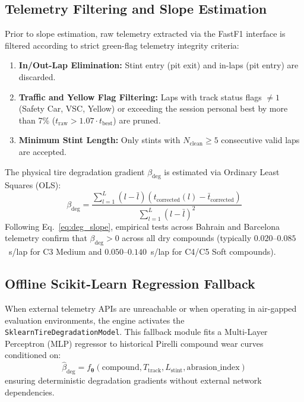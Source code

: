\subsection{Telemetry Filtering and Slope Estimation}
Prior to slope estimation, raw telemetry extracted via the FastF1 interface \cite{roembke2021fastf1} is filtered according to strict green-flag telemetry integrity criteria:
\begin{enumerate}
    \item \textbf{In/Out-Lap Elimination:} Stint entry (pit exit) and in-laps (pit entry) are discarded.
    \item \textbf{Traffic and Yellow Flag Filtering:} Laps with track status flags $\ne 1$ (Safety Car, VSC, Yellow) or exceeding the session personal best by more than 7\% ($t_{\text{raw}} > 1.07 \cdot t_{\text{best}}$) are pruned.
    \item \textbf{Minimum Stint Length:} Only stints with $N_{\text{clean}} \ge 5$ consecutive valid laps are accepted.
\end{enumerate}

The physical tire degradation gradient $\beta_{\text{deg}}$ is estimated via Ordinary Least Squares (OLS):
\begin{equation}
\beta_{\text{deg}} = \frac{\sum_{l=1}^{L} (l - \bar{l})(t_{\text{corrected}}(l) - \bar{t}_{\text{corrected}})}{\sum_{l=1}^{L} (l - \bar{l})^2}
\label{eq:deg_slope}
\end{equation}
Following Eq.~\eqref{eq:deg_slope}, empirical tests across Bahrain and Barcelona telemetry confirm that $\beta_{\text{deg}} > 0$ across all dry compounds (typically $0.020$--$0.085$~s/lap for C3 Medium and $0.050$--$0.140$~s/lap for C4/C5 Soft compounds).

\subsection{Offline Scikit-Learn Regression Fallback}
When external telemetry APIs are unreachable or when operating in air-gapped evaluation environments, the engine activates the \texttt{SklearnTireDegradationModel}. This fallback module fits a Multi-Layer Perceptron (MLP) regressor to historical Pirelli compound wear curves conditioned on:
\begin{equation}
\hat{\beta}_{\text{deg}} = f_{\boldsymbol{\theta}}\left( \text{compound}, T_{\text{track}}, L_{\text{stint}}, \text{abrasion\_index} \right)
\label{eq:tire_fallback}
\end{equation}
ensuring deterministic degradation gradients without external network dependencies.
